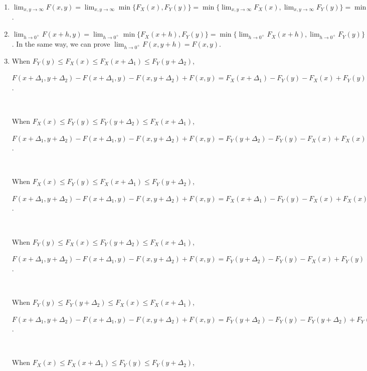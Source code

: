 \documentclass{article}
\begin{document}
\begin{enumerate}[leftmargin = 0 em, label = \arabic*., font = \bfseries]
\begin{enumerate}
\begin{enumerate}
		 	\item 
		 	$\lim_{x,y \to \infty} F(x,y) = \lim_{x,y\to\infty}\min\{F_X (x), F_Y (y)\} = \min\{\lim_{x,y \to \infty} F_X (x) , \lim_{x,y \to \infty} F_Y (y)\} = \min\{1,1\} = 1$.

		 	\item 
		 	$\lim_{h \to 0^+} F(x + h , y) = \lim_{h \to 0^+} \min\{F_X(x + h), F_Y(y)\} = \min\{\lim_{h \to 0^+}F_{X}(x+h), \lim_{h \to 0^+}F_Y(y)\} = \min\{F_X(x), F_Y (y)\} = F(x,y)$. In the same way, we can prove $\lim_{h\to 0^+}F(x, y+h) = F(x,y)$. 

		 	\item When $F_Y(y) \leq F_X(x) \leq  F_X(x+ \Delta_1) \leq F_Y(y + \Delta_2) $, 

		 	$F(x+\Delta_1 , y + \Delta_2) - F(x+ \Delta_1,y) - F(x, y + \Delta_2) + F(x,y) = F_X (x +\Delta_1 ) - F_Y(y) - F_X (x) + F_{Y}(y) = F_X (x + \Delta_1) - F_X (x) \geq 0$.

		 	\

		 	When $F_X(x) \leq F_Y(y) \leq  F_Y(y+ \Delta_2) \leq F_X(x + \Delta_1) $, 

		 	$F(x+\Delta_1 , y + \Delta_2) - F(x+ \Delta_1,y) - F(x, y + \Delta_2) + F(x,y) = F_Y (y +\Delta_2 ) - F_Y(y) - F_X (x) + F_{X}(x) = F_Y (y + \Delta_2) - F_Y (y) \geq 0$.

		 	\

		 	When $F_X(x) \leq F_Y(y) \leq  F_X(x+ \Delta_1) \leq F_Y(y + \Delta_2) $, 

		 	$F(x+\Delta_1 , y + \Delta_2) - F(x+ \Delta_1,y) - F(x, y + \Delta_2) + F(x,y) = F_X (x +\Delta_1 ) - F_{Y}(y) - F_X (x) + F_{X}(x) = F_X (x + \Delta_1) - F_Y (y) \geq 0$.

		 	\

		 	When $F_Y(y) \leq F_X(x) \leq  F_Y(y + \Delta_2) \leq F_X(x + \Delta_1) $, 

		 	$F(x+\Delta_1 , y + \Delta_2) - F(x+ \Delta_1,y) - F(x, y + \Delta_2) + F(x,y) = F_Y (y +\Delta_2 ) - F_Y(y) - F_X (x) + F_{Y}(y) = F_Y (y + \Delta_2) - F_X (x) \geq 0$.

		 	\

		 	When $F_Y(y) \leq F_Y(y + \Delta_2) \leq  F_X(x) \leq F_X(x + \Delta_1) $, 

		 	$F(x+\Delta_1 , y + \Delta_2) - F(x+ \Delta_1,y) - F(x, y + \Delta_2) + F(x,y) = F_Y (y +\Delta_2 ) - F_Y(y) - F_Y (y + \Delta_2) + F_{Y}(y) =  0$.

		 	\

		 	When $F_X(x) \leq F_X(x + \Delta_1) \leq  F_Y(y) \leq F_Y(y + \Delta_2) $, 


\end{enumerate}
\end{enumerate}
\end{enumerate}
\end{document}

